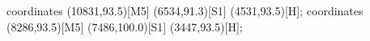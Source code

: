  coordinates {(10831,93.5)[M5] (6534,91.3)[S1] (4531,93.5)[H]};
 coordinates {(8286,93.5)[M5] (7486,100.0)[S1] (3447,93.5)[H]};
